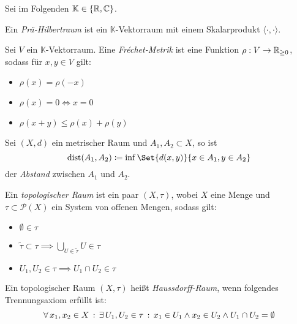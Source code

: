 \documentclass{cheat-sheet}
\newcommand{\K}{\mathbb{K}}
\begin{document}

\begin{nota}
  Sei im Folgenden $\K \in \{ \R, \C \}$.
\end{nota}


\begin{defn}
  Ein \emph{Prä-Hilbertraum} ist ein $\K$-Vektorraum mit einem Skalarprodukt $\langle \cdot , \cdot \rangle$.
\end{defn}

\begin{defn}
  Sei $V$ ein $\K$-Vektorraum. Eine \emph{Fréchet-Metrik} ist eine Funktion $\rho : V \to \mathbb{R}_{\geq 0}$, sodass für $x, y \in V$ gilt:
  \begin{itemize}
    \item $\rho(x) = \rho(-x)$
    \item $\rho(x) = 0 \iff x = 0$
    \item $\rho(x + y) \leq \rho(x) + \rho(y)$
  \end{itemize}
\end{defn}

\begin{defn}
  Sei $(X, d)$ ein metrischer Raum und $A_1, A_2 \subset X$, so ist
  \[ \mathrm{dist}(A_1, A_2) \coloneqq \inf \Set{ d(x,y) }{ x \in A_1, y \in A_2 } \]
  der \emph{Abstand} zwischen $A_1$ und $A_2$.
\end{defn}

\begin{defn}
  Ein \emph{topologischer Raum} ist ein paar $(X, \tau)$, wobei $X$ eine Menge und $\tau \subset \mathcal{P}(X)$ ein System von offenen Mengen, sodass gilt:
  \begin{itemize}
    \item $\emptyset \in \tau$
    \item $\tilde\tau \subset \tau \implies \bigcup_{U \in \tilde\tau} U \in \tau$
    \item $U_1, U_2 \in \tau \implies U_1 \cap U_2 \in \tau$
  \end{itemize}
\end{defn}

\begin{defn}
  Ein topologischer Raum $(X, \tau)$ heißt \emph{Haussdorff-Raum}, wenn folgendes Trennungsaxiom erfüllt ist:
  \[ \forall \, {x_1, x_2 \in X} \,:\, \exists \, {U_1, U_2 \in \tau} \,:\, x_1 \in U_1 \wedge x_2 \in U_2 \wedge U_1 \cap U_2 = \emptyset \]
\end{defn}
\end{document}
